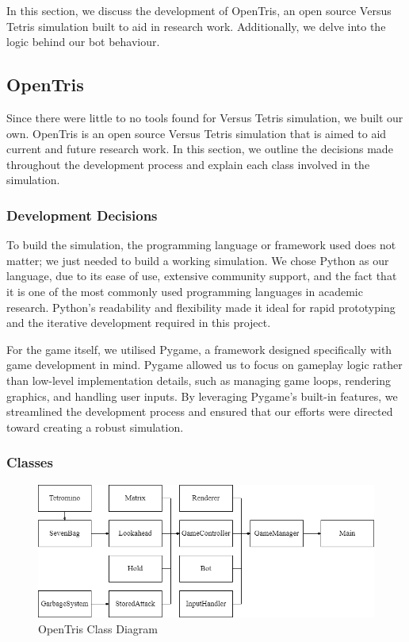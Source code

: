 \documentclass[a4paper, 12pt]{extreport}
\begin{document}
		In this section, we discuss the development of OpenTris, an open source Versus Tetris simulation built to aid in research work. Additionally, we delve into the logic behind our bot behaviour.

		\subsection{OpenTris}
		
			Since there were little to no tools found for Versus Tetris simulation, we built our own. OpenTris is an open source Versus Tetris simulation that is aimed to aid current and future research work. In this section, we outline the decisions made throughout the development process and explain each class involved in the simulation.
			
			\subsubsection{Development Decisions}
			
				To build the simulation, the programming language or framework used does not matter; we just needed to build a working simulation. We chose Python as our language, due to its ease of use, extensive community support, and the fact that it is one of the most commonly used programming languages in academic research. Python’s readability and flexibility made it ideal for rapid prototyping and the iterative development required in this project.
				
				For the game itself, we utilised Pygame, a framework designed specifically with game development in mind. Pygame allowed us to focus on gameplay logic rather than low-level implementation details, such as managing game loops, rendering graphics, and handling user inputs. By leveraging Pygame's built-in features, we streamlined the development process and ensured that our efforts were directed toward creating a robust simulation.
			
			\subsubsection{Classes}
			
				\begin{figure}
					\centering
					\includegraphics[width=\textwidth]{diagrams/class-diagrams.png}
					\caption{OpenTris Class Diagram}
					\label{fig:opentris}
				\end{figure}
			
\end{document}

